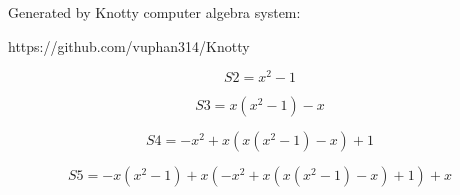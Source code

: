 \documentclass[letterpaper, 10pt]{extarticle}
\begin{document}
Generated by Knotty computer algebra system:

https://github.com/vuphan314/Knotty

\hrulefill

\begin{dmath*}
S2 =
    x^{2} - 1
\end{dmath*}


\begin{dmath*}
S3 =
    x \left(x^{2} - 1\right) - x
\end{dmath*}


\begin{dmath*}
S4 =
    - x^{2} + x \left(x \left(x^{2} - 1\right) - x\right) + 1
\end{dmath*}


\begin{dmath*}
S5 =
    - x \left(x^{2} - 1\right) + x \left(- x^{2} + x \left(x \left(x^{2} - 1\right) - x\right) + 1\right) + x
\end{dmath*}
\end{document}
